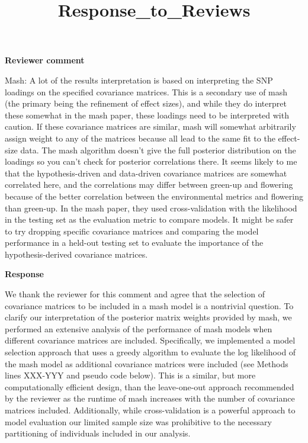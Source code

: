 \documentclass[
  letterpaper,
  DIV=11,
  numbers=noendperiod]{scrartcl}
\title{Response\_to\_Reviews}
\author{}
\date{}
\begin{document}
\maketitle

\textbf{Reviewer comment}

Mash: A lot of the results interpretation is based on interpreting the
SNP loadings on the specified covariance matrices. This is a secondary
use of mash (the primary being the refinement of effect sizes), and
while they do interpret these somewhat in the mash paper, these loadings
need to be interpreted with caution. If these covariance matrices are
similar, mash will somewhat arbitrarily assign weight to any of the
matrices because all lead to the same fit to the effect-size data. The
mash algorithm doesn't give the full posterior distribution on the
loadings so you can't check for posterior correlations there. It seems
likely to me that the hypothesis-driven and data-driven covariance
matrices are somewhat correlated here, and the correlations may differ
between green-up and flowering because of the better correlation between
the environmental metrics and flowering than green-up. In the mash
paper, they used cross-validation with the likelihood in the testing set
as the evaluation metric to compare models. It might be safer to try
dropping specific covariance matrices and comparing the model
performance in a held-out testing set to evaluate the importance of the
hypothesis-derived covariance matrices.

\hfill\break

\textbf{Response}

We thank the reviewer for this comment and agree that the selection of
covariance matrices to be included in a mash model is a nontrivial
question. To clarify our interpretation of the posterior matrix weights
provided by mash, we performed an extensive analysis of the performance
of mash models when different covariance matrices are included.
Specifically, we implemented a model selection approach that uses a
greedy algorithm to evaluate the log likelihood of the mash model as
additional covariance matrices were included (see Methods lines XXX-YYY
and pseudo code below). This is a similar, but more computationally
efficient design, than the leave-one-out approach recommended by the
reviewer as the runtime of mash increases with the number of covariance
matrices included. Additionally, while cross-validation is a powerful
approach to model evaluation our limited sample size was prohibitive to
the necessary partitioning of individuals included in our analysis.
\end{document}
